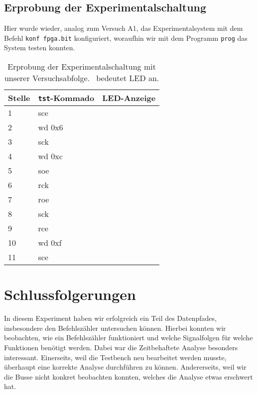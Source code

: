 \documentclass[12pt,a4paper]{scrartcl}
\begin{document}
\subsection{Erprobung der Experimentalschaltung}

Hier wurde wieder, analog zum Versuch A1, das Experimentalsystem mit dem Befehl \texttt{konf fpga.bit} konfiguriert, woraufhin wir mit dem Programm \texttt{prog} das System testen konnten.


\newcommand{\off}{\fullmoon}
\newcommand{\on}{\newmoon}

\begin{table}[h]
    \centering
    \caption{Erprobung der Experimentalschaltung mit unserer Versuchsabfolge.
    \on\ bedeutet LED an.}
    \begin{tabular}{l|l|l}
    \hline
    Stelle & \texttt{tst}-Kommado & LED-Anzeige    \\
    \hline
    1      & sce               & \off \off \off \off  \\
    2      & wd 0x6            & \off \off \off \off  \\
    3      & sck               & \off \on  \on  \off \\
    4      & wd 0xc            & \on  \on  \off \off \\
    5      & soe               & \off \off \off \off \\
    6      & rck               & \off \off \off \off \\
    7      & roe               & \on  \on  \off \off  \\
    8      & sck               & \on  \on  \off \off \\
    9      & rce               & \on  \on  \off \off \\
    10     & wd 0xf            & \on  \on  \off \off \\
    11     & sce               & \on  \on  \on  \on  \\
    \hline
    \end{tabular}
    \label{erprobung}
\end{table}



\section{Schlussfolgerungen}
In diesem Experiment haben wir erfolgreich ein Teil des Datenpfades, insbesondere den Befehlsz\"ahler untersuchen k\"onnen. Hierbei konnten wir beobachten, wie ein Befehlsz\"ahler funktioniert und welche Signalfolgen f\"ur welche Funktionen ben\"otigt werden. Dabei war die Zeitbehaftete Analyse besonders interessant. Einerseits, weil die Testbench neu bearbeitet werden musste, \"uberhaupt eine korrekte Analyse durchf\"uhren zu k\"onnen. Andererseits, weil wir die Busse nicht konkret beobachten konnten, welches die Analyse etwas erschwert hat.
\end{document}
